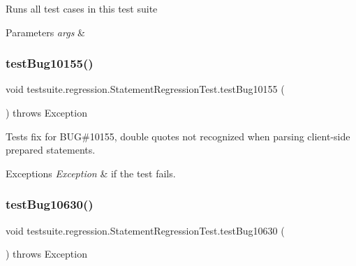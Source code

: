 Runs all test cases in this test suite


\begin{DoxyParams}{Parameters}
{\em args} & \\
\hline
\end{DoxyParams}
\mbox{\label{classtestsuite_1_1regression_1_1_statement_regression_test_a662e79a8152a1c9cefcfde5ea2a7c046}} 
\subsubsection{\texorpdfstring{test\+Bug10155()}{testBug10155()}}
{\footnotesize\ttfamily void testsuite.\+regression.\+Statement\+Regression\+Test.\+test\+Bug10155 (\begin{DoxyParamCaption}{ }\end{DoxyParamCaption}) throws Exception}

Tests fix for B\+UG\#10155, double quotes not recognized when parsing client-\/side prepared statements.


\begin{DoxyExceptions}{Exceptions}
{\em Exception} & if the test fails. \\
\hline
\end{DoxyExceptions}
\mbox{\label{classtestsuite_1_1regression_1_1_statement_regression_test_a5cd95ffb44229da2afd247495385088c}} 
\subsubsection{\texorpdfstring{test\+Bug10630()}{testBug10630()}}
{\footnotesize\ttfamily void testsuite.\+regression.\+Statement\+Regression\+Test.\+test\+Bug10630 (\begin{DoxyParamCaption}{ }\end{DoxyParamCaption}) throws Exception}

